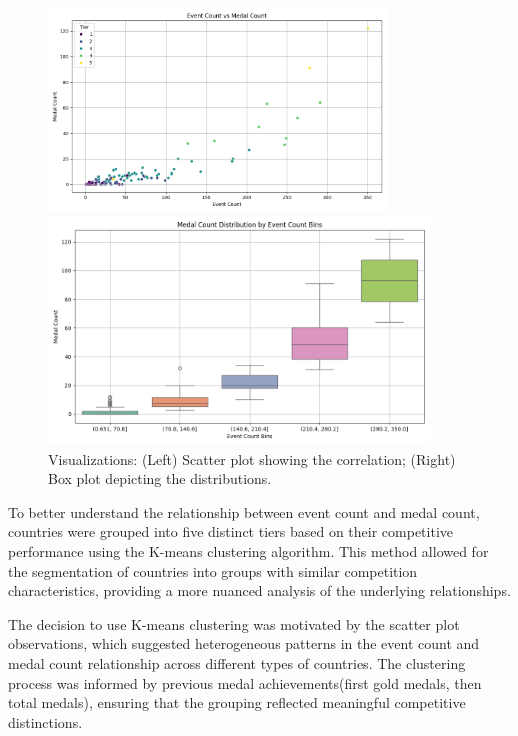 \documentclass{mcmthesis}
\begin{document}
    
\begin{figure}[htbp]
    \begin{minipage}[t]{0.5\textwidth}
        \centering
        \includegraphics[width=0.8\textwidth]{pics/event_count_vs_medal_count.png}
    \end{minipage}
    \begin{minipage}[t]{0.5\textwidth}
        \centering
        \includegraphics[width=0.9\textwidth]{pics/medal_count_distribution_by_event_count_bins.png}
    \end{minipage}
    \caption{Visualizations: (Left) Scatter plot showing the correlation; 
    (Right) Box plot depicting the distributions.}
\end{figure}

    To better understand the relationship between event count and medal count, countries were grouped into five distinct tiers based on their competitive performance using the K-means clustering algorithm. This method allowed for the segmentation of countries into groups with similar competition characteristics, providing a more nuanced analysis of the underlying relationships.

    The decision to use K-means clustering was motivated by the scatter plot observations, which suggested heterogeneous patterns in the event count and medal count relationship across different types of countries. The clustering process was informed by previous medal achievements(first gold medals, then total medals), ensuring that the grouping reflected meaningful competitive distinctions.
    
\end{document}
